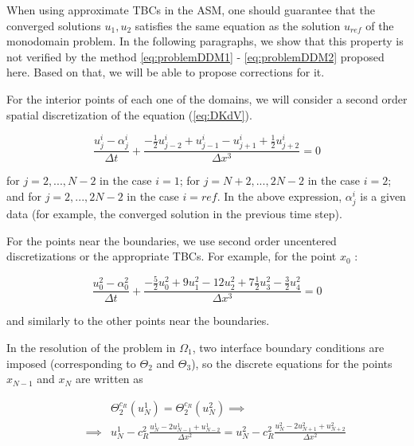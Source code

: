 \indent When using approximate TBCs in the ASM, one should guarantee that the converged solutions $u_1,u_2$ satisfies the same equation as the solution $u_{ref}$ of the monodomain problem. In the following paragraphs, we show that this property is not verified by the method \eqref{eq:problemDDM1} - \eqref{eq:problemDDM2} proposed here. Based on that, we will be able to propose corrections for it.

\indent For the interior points of each one of the domains, we will consider a second order spatial discretization of the equation (\ref{eq:DKdV}).

\begin{equation}
    \label{eq:FDdiscretization}
    \frac{u_j^i - \alpha_j^i}{\Delta t} + \frac{-\frac{1}{2}u_{j-2}^i + u_{j-1}^i - u_{j+1}^i + \frac{1}{2}u_{j+2}^i }{\Delta x ^3} = 0
\end{equation}

\indent for $j=2,...,N-2$ in the case $i=1$; for $j=N+2,...,2N-2$ in the case $i=2$; and for $j=2,...,2N-2$ in the case $i=ref$. In the above expression, $\alpha_j^i$ is a given data (for example, the converged solution in the previous time step).

\indent For the points near the boundaries, we use second order uncentered discretizations or the appropriate TBCs. For example, for the point $x_0$ : 

\begin{equation}
    \label{eq:uncenteredFDdiscretization0}
    \frac{u_{0}^2 - \alpha_{0}^2}{\Delta t} + \frac{-\frac{5}{2}u_{0}^2 + 9u_{1}^2 - 12 u_{2}^2 + 7\frac{1}{2}u_{3}^2 -\frac{3}{2}u_{4}^2}{\Delta x ^3} = 0
\end{equation}

\noindent and similarly to the other points near the boundaries.

\indent In the resolution of the problem in $\Omega_1$, two interface boundary conditions are imposed (corresponding to $\Theta_2$ and $\Theta_3$), so the discrete equations for the points $x_{N-1}$ and $x_N$ are written as

\begin{equation}
	\begin{aligned}
    \label{eq:TBCsIterOmega1A}
    && 				&\Theta_2^{c_R}(u_N^1) = \Theta_2^{c_R}(u_N^2) \implies \\ 
    && \implies & u_N^1 - c_R^2 \frac{u_N^1 - 2u_{N-1}^1 + u_{N-2}^1}{\Delta x^2} = u_N^2 - c_R^2 \frac{u_N^2 - 2u_{N+1}^2 + u_{N+2}^2}{\Delta x^2} 
    \end{aligned}
\end{equation}

